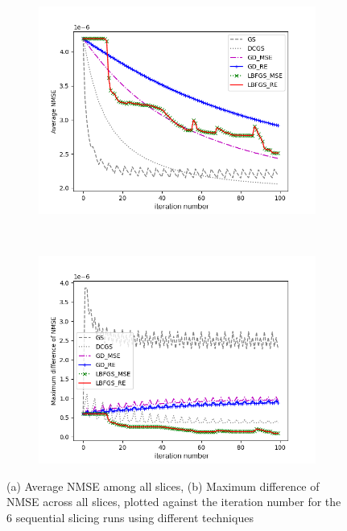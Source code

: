 \begin{figure}[H]
	\centering
	\begin{subfigure}[t]{0.8\textwidth}
		\centering
		\includegraphics[trim={20 5 40 40}, clip, width=\textwidth]{ss/Sequential_Slicing_Methods_Average_NMSE.png}
		\caption{}
		\label{fig:Sequential_Slicing_Methods_Average_NMSE}
	\end{subfigure}\\
	\begin{subfigure}[t]{0.8\textwidth}
		\centering
		\includegraphics[trim={20 5 40 40}, clip, width=\textwidth]{ss/Sequential_Slicing_Methods_Max_Diff_NMSE.png}
		\caption{}
		\label{fig:Sequential_Slicing_Methods_Max_Diff_NMSE}
	\end{subfigure}
	\caption{(a) Average NMSE among all slices, (b) Maximum difference of NMSE across all slices, plotted against the iteration number for the 6 sequential slicing runs using different techniques}
	\label{fig:Sequential_Slicing_Methods}
\end{figure}




